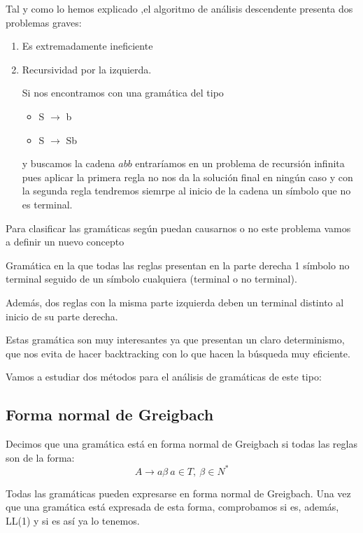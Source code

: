 \documentclass{apuntes}
\begin{document}
Tal y como lo hemos explicado ,el algoritmo de análisis descendente presenta dos problemas graves:
\begin{enumerate}
\item Es extremadamente ineficiente
\item Recursividad por la izquierda.

Si nos encontramos con una gramática del tipo
\begin{itemize}
\item S $\rightarrow$ b
\item S $\rightarrow$ Sb
\end{itemize}
y buscamos la cadena $abb$ entraríamos en un problema de recursión infinita pues aplicar la primera regla no nos da la solución final en ningún caso y con la segunda regla tendremos siemrpe al inicio de la cadena un símbolo que no es terminal.
\end{enumerate}

Para clasificar las gramáticas según puedan causarnos o no este problema vamos a definir un nuevo concepto

\begin{defn}[Gramática LL(1)]
Gramática en la que todas las reglas presentan en la parte derecha 1 símbolo no terminal seguido de un símbolo cualquiera (terminal o no terminal).

Además, dos reglas con la misma parte izquierda deben un terminal distinto al inicio de su parte derecha.
\end{defn}

Estas gramática son muy interesantes ya que presentan un claro determinismo, que nos evita de hacer backtracking con lo que hacen la búsqueda muy eficiente.


Vamos a estudiar dos métodos para el análisis de gramáticas de este tipo:
\subsection{Forma normal de Greigbach}

\begin{defn}
Decimos que una gramática está en forma normal de Greigbach si todas las reglas son de la forma:
\[A \rightarrow a\beta \ a \in T, \ \beta \in N^*\]
\end{defn}
Todas las gramáticas pueden expresarse en forma normal de Greigbach. Una vez que una gramática está expresada de esta forma, comprobamos si es, además, LL(1) y si es así ya lo tenemos.
\end{document}
